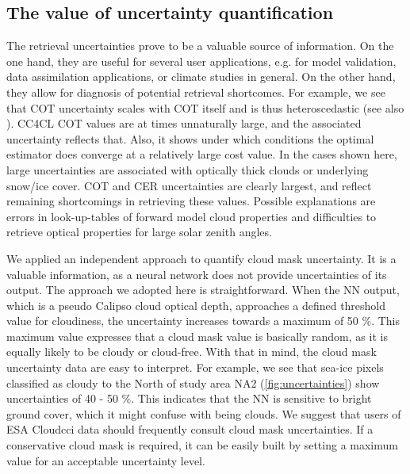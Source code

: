\subsection{The value of uncertainty quantification}


The retrieval uncertainties prove to be a valuable source of information. On the one hand, they are useful for several user applications, e.g. for model validation, data assimilation applications, or climate studies in general. On the other hand, they allow for diagnosis of potential retrieval shortcomes. For example, we see that COT uncertainty scales with COT itself and is thus heteroscedastic (see also \citet{Poulsen12}). CC4CL COT values are at times unnaturally large, and the associated uncertainty reflects that. Also, it shows under which conditions the optimal estimator does converge at a relatively large cost value. In the cases shown here, large uncertainties are associated with optically thick clouds or underlying snow/ice cover. COT and CER uncertainties are clearly largest, and reflect remaining shortcomings in retrieving these values. Possible explanations are errors in look-up-tables of forward model cloud properties and difficulties to retrieve optical properties for large solar zenith angles.

We applied an independent approach to quantify cloud mask uncertainty. It is a valuable information, as a neural network does not provide uncertainties of its output. The approach we adopted here is straightforward. When the NN output, which is a pseudo Calipso cloud optical depth, approaches a defined threshold value for cloudiness, the uncertainty increases towards a maximum of 50 \%. This maximum value expresses that a cloud mask value is basically random, as it is equally likely to be cloudy or cloud-free. With that in mind, the cloud mask uncertainty data are easy to interpret. For example, we see that sea-ice pixels classified as cloudy to the North of study area NA2 (\cref{fig:uncertainties}) show uncertainties of 40 - 50 \%. This indicates that the NN is sensitive to bright ground cover, which it might confuse with being clouds. We suggest that users of ESA Cloud\textunderscore cci data should frequently consult cloud mask uncertainties. If a conservative cloud mask is required, it can be easily built by setting a maximum value for an acceptable uncertainty level.

